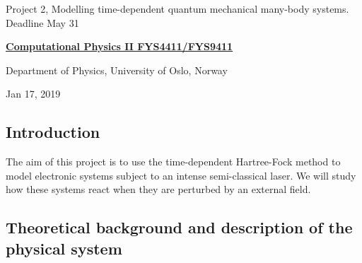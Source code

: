 \documentclass[%
oneside,                 %
final,                   %
10pt]{article}
\begin{document}

\newcommand{\exercisesection}[1]{\subsection*{#1}}






\thispagestyle{empty}

\begin{center}
{\LARGE\bf
\begin{spacing}{1.25}
Project 2, Modelling time-dependent quantum mechanical many-body systems. Deadline May 31
\end{spacing}
}
\end{center}


\begin{center}
{\bf \href{{http://www.uio.no/studier/emner/matnat/fys/FYS4411/index-eng.html}}{Computational Physics II FYS4411/FYS9411}}
\end{center}

    \begin{center}
\centerline{{\small Department of Physics, University of Oslo, Norway}}
\end{center}
    

\begin{center}
Jan 17, 2019
\end{center}

\vspace{1cm}


\subsection*{Introduction}

The aim of this project is to use the time-dependent Hartree-Fock method to
model electronic systems subject to an intense semi-classical laser. We will
study how these systems react when they are perturbed by an external field.


\subsection*{Theoretical background and description of the physical system}
\end{document}
